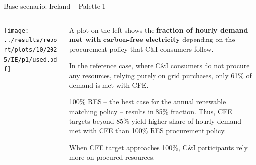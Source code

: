 \begin{frame}{Base scenario: Ireland -- Palette 1}

{\footnotesize
\vspace{0.3cm}

\begin{columns}[T]
\begin{column}{9cm}
\centering

\texttt{[image: ../results/report/plots/10/2025/IE/p1/used.pdf]}
\end{column}
\begin{column}{6cm}

\vspace{0.1cm}
A plot on the left shows the {\bf fraction of hourly demand met with carbon-free
electricity} depending on the procurement policy that C\&I consumers follow.

\vspace{0.3cm}
In the reference case, where C\&I consumers do not procure any resources,  
relying purely on grid purchases, \alert{only 61\%} of demand is met with CFE.

\vspace{0.3cm}
100\% RES -- the best case for the annual renewable matching policy -- 
results in 85\% fraction. Thus, \alert{CFE targets beyond 85\%} yield 
higher share of hourly demand met with CFE
than 100\% RES procurement policy.

\vspace{0.3cm}
When CFE target approaches 100\%, C\&I participants 
\alert{rely more on procured resources}.

\end{column}
\end{columns}
}
\end{frame}



